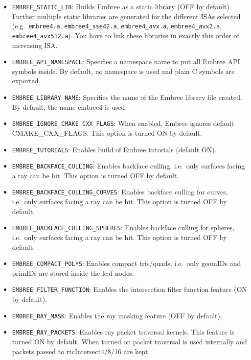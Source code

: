 \begin{itemize}
  Per default, this option is set to ``none'' to enable JIT compilation.
  We recommend using JIT compilation as this enables the use of
  specialization constants to reduce code complexity.
\item
  \texttt{EMBREE\_STATIC\_LIB}: Builds Embree as a static library (OFF
  by default). Further multiple static libraries are generated for the
  different ISAs selected (e.g.~\texttt{embree4.a},
  \texttt{embree4\_sse42.a}, \texttt{embree4\_avx.a},
  \texttt{embree4\_avx2.a}, \texttt{embree4\_avx512.a}). You have to
  link these libraries in exactly this order of increasing ISA.
\item
  \texttt{EMBREE\_API\_NAMESPACE}: Specifies a namespace name to put all
  Embree API symbols inside. By default, no namespace is used and plain
  C symbols are exported.
\item
  \texttt{EMBREE\_LIBRARY\_NAME}: Specifies the name of the Embree
  library file created. By default, the name embree4 is used.
\item
  \texttt{EMBREE\_IGNORE\_CMAKE\_CXX\_FLAGS}: When enabled, Embree
  ignores default CMAKE\_CXX\_FLAGS. This option is turned ON by
  default.
\item
  \texttt{EMBREE\_TUTORIALS}: Enables build of Embree tutorials (default
  ON).
\item
  \texttt{EMBREE\_BACKFACE\_CULLING}: Enables backface culling,
  i.e.~only surfaces facing a ray can be hit. This option is turned OFF
  by default.
\item
  \texttt{EMBREE\_BACKFACE\_CULLING\_CURVES}: Enables backface culling
  for curves, i.e.~only surfaces facing a ray can be hit. This option is
  turned OFF by default.
\item
  \texttt{EMBREE\_BACKFACE\_CULLING\_SPHERES}: Enables backface culling
  for spheres, i.e.~only surfaces facing a ray can be hit. This option
  is turned OFF by default.
\item
  \texttt{EMBREE\_COMPACT\_POLYS}: Enables compact tris/quads, i.e.~only
  geomIDs and primIDs are stored inside the leaf nodes.
\item
  \texttt{EMBREE\_FILTER\_FUNCTION}: Enables the intersection filter
  function feature (ON by default).
\item
  \texttt{EMBREE\_RAY\_MASK}: Enables the ray masking feature (OFF by
  default).
\item
  \texttt{EMBREE\_RAY\_PACKETS}: Enables ray packet traversal kernels.
  This feature is turned ON by default. When turned on packet traversal
  is used internally and packets passed to rtcIntersect4/8/16 are kept

\end{itemize}
